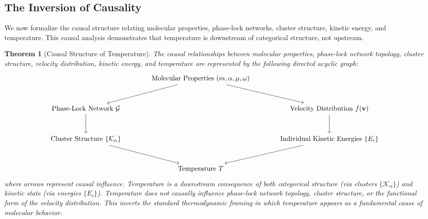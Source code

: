 \documentclass[12pt,a4paper]{article}
\newtheorem{theorem}{Theorem}[section]
\theoremstyle{definition}
\theoremstyle{remark}
\newcommand{\phaselockgraph}{\mathcal{G}}
\begin{document}
\subsection{The Inversion of Causality}

We now formalize the causal structure relating molecular properties, phase-lock networks, cluster structure, kinetic energy, and temperature. This causal analysis demonstrates that temperature is downstream of categorical structure, not upstream.

\begin{theorem}[Causal Structure of Temperature]
\label{thm:causal_structure}
The causal relationships between molecular properties, phase-lock network topology, cluster structure, velocity distribution, kinetic energy, and temperature are represented by the following directed acyclic graph:
\begin{equation}
\begin{tikzcd}[row sep=large, column sep=large]
& \text{Molecular Properties } (m, \alpha, \mu, \omega) \arrow[dl] \arrow[dr] & \\
\text{Phase-Lock Network } \phaselockgraph \arrow[d] & & \text{Velocity Distribution } f(\mathbf{v}) \arrow[d] \\
\text{Cluster Structure } \{\mathcal{K}_\alpha\} \arrow[dr] & & \text{Individual Kinetic Energies } \{E_i\} \arrow[dl] \\
& \text{Temperature } T &
\end{tikzcd}
\label{eq:causal_dag}
\end{equation}
where arrows represent causal influence. Temperature is a downstream consequence of both categorical structure (via clusters $\{\mathcal{K}_\alpha\}$) and kinetic state (via energies $\{E_i\}$). Temperature does not causally influence phase-lock network topology, cluster structure, or the functional form of the velocity distribution. This inverts the standard thermodynamic framing in which temperature appears as a fundamental cause of molecular behavior.
\end{theorem}
\end{document}
